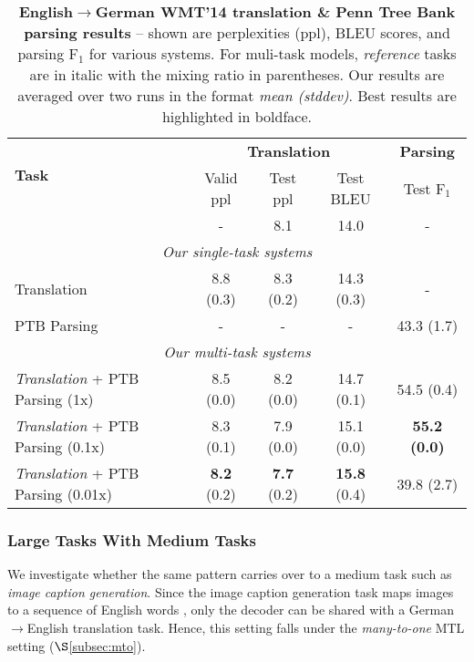 \begin{table}[tbh!]
\centering
\begin{tabular}{l|c|c|c|c}
\multirow{ 2}{*}{\bf{Task}} & \multicolumn{3}{c|}{{\bf Translation}} &
\multicolumn{1}{c}{{\bf
Parsing}}\\
  \cline{2-5}
  & Valid ppl & Test ppl & Test BLEU & Test F$_1$ \\
  \hline
\citep{luong15attn} & - & 8.1 & 14.0 & -  \\
  \hline
\multicolumn{5}{c}{{\it Our single-task systems}} \\
  \hline
Translation & 8.8 (0.3) & 8.3 (0.2) & 14.3 (0.3) & -\\
  \hline
PTB Parsing & - & - & - & 43.3 (1.7) \\
  \hline
\multicolumn{5}{c}{{\it Our multi-task systems}} \\
  \hline
{\it Translation} + PTB Parsing (1x) &  8.5 (0.0) & 8.2 (0.0) & 14.7 (0.1) & 54.5 (0.4) \\
  \hline
{\it Translation} + PTB Parsing (0.1x) &  8.3 (0.1) & 7.9 (0.0) & 15.1 (0.0) &
{\bf 55.2 (0.0)}\\
  \hline
{\it Translation} + PTB Parsing (0.01x) &  {\bf 8.2} (0.2) & {\bf 7.7} (0.2) & {\bf
15.8} (0.4) & 39.8 (2.7) \\
\end{tabular}
\caption{{\bf English$\rightarrow$German WMT'14 translation \& Penn Tree Bank parsing results} --
shown are perplexities (ppl), BLEU scores, and parsing F$_1$ for various systems. For muli-task
models, {\it reference} tasks are in
italic with the mixing ratio in parentheses. Our results are averaged over two
runs
in the format {\it mean (stddev)}. Best results are
highlighted in boldface.}
\label{t:big_small}
\end{table}

\subsubsection{Large Tasks With Medium Tasks} %
We investigate whether the same pattern carries over to a medium task
such as {\it image caption generation}. Since the image caption
generation task maps images to a sequence of
English words \citep{vinyals15caption,xu15}, only the decoder can be
shared with a German$\rightarrow$English translation task. Hence, this
setting falls under the {\it many-to-one} MTL setting ($\S$\ref{subsec:mto}).

